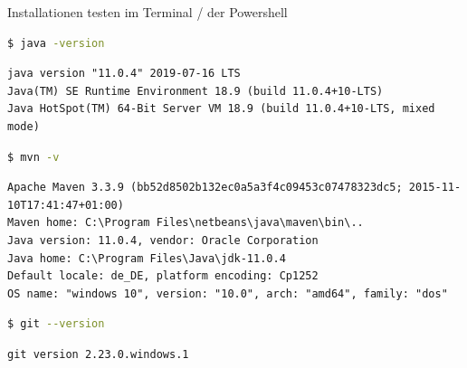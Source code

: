 \documentclass[10pt]{scrartcl}
\begin{document}
Installationen testen im Terminal / der Powershell
\begin{lstlisting}[language=bash,belowskip=2mm,frame=t]
$ java -version 
\end{lstlisting}
\begin{lstlisting}[style=response] 
java version "11.0.4" 2019-07-16 LTS
Java(TM) SE Runtime Environment 18.9 (build 11.0.4+10-LTS)
Java HotSpot(TM) 64-Bit Server VM 18.9 (build 11.0.4+10-LTS, mixed mode)
\end{lstlisting}

\begin{lstlisting}[language=bash,belowskip=2mm,frame=t]
$ mvn -v 
\end{lstlisting}
\begin{lstlisting}[style=response] 
Apache Maven 3.3.9 (bb52d8502b132ec0a5a3f4c09453c07478323dc5; 2015-11-10T17:41:47+01:00)
Maven home: C:\Program Files\netbeans\java\maven\bin\..
Java version: 11.0.4, vendor: Oracle Corporation
Java home: C:\Program Files\Java\jdk-11.0.4
Default locale: de_DE, platform encoding: Cp1252
OS name: "windows 10", version: "10.0", arch: "amd64", family: "dos"
\end{lstlisting}

\begin{lstlisting}[language=bash,belowskip=2mm,frame=t]
$ git --version
\end{lstlisting}
\begin{lstlisting}[style=response] 
git version 2.23.0.windows.1
\end{lstlisting}
\end{document}
